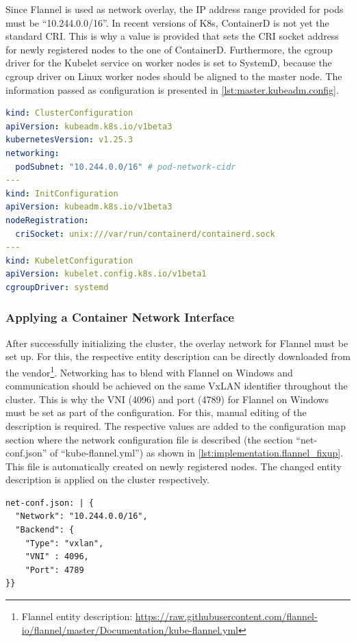 Since Flannel is used as network overlay, the \ac{IP} address range provided for pods must be \enquote{10.244.0.0/16}\cite{GitHubKubernetesSIGWindowsTools.20230213}.
In recent versions of \ac{K8s}, ContainerD is not yet the standard \ac{CRI}. This is why a value is provided that sets the \ac{CRI} socket address for newly registered nodes to the one of ContainerD.
Furthermore, the \ac{cgroup} driver for the Kubelet service on worker nodes is set to SystemD, because the \ac{cgroup} driver on Linux worker nodes should be aligned to the master node.
The information passed as configuration is presented in \autoref{lst:master.kubeadm.config}.
\begin{lstlisting}[label=lst:master.kubeadm.config, caption={YAML configuration for providing configuration for the cluster and newly registered ndoes. (\textit{Distribution/Controlplane/kubeadm\_config.yaml})}, language=yaml]
kind: ClusterConfiguration
apiVersion: kubeadm.k8s.io/v1beta3
kubernetesVersion: v1.25.3
networking:
  podSubnet: "10.244.0.0/16" # pod-network-cidr
---
kind: InitConfiguration
apiVersion: kubeadm.k8s.io/v1beta3
nodeRegistration:
  criSocket: unix:///var/run/containerd/containerd.sock
---
kind: KubeletConfiguration
apiVersion: kubelet.config.k8s.io/v1beta1
cgroupDriver: systemd
\end{lstlisting}


\subsubsection{Applying a Container Network Interface}
After successfully initializing the cluster, the overlay network for Flannel must be set up.
For this, the respective entity description can be directly downloaded from the vendor\footnote{Flannel entity description: \href{https://raw.githubusercontent.com/flannel-io/flannel/master/Documentation/kube-flannel.yml}{https://raw.githubusercontent.com/flannel-io/flannel/master/Documentation/kube-flannel.yml}}. Networking has to blend with Flannel on \ac{Windows} and communication should be achieved on the same \ac{VxLAN} identifier throughout the cluster. This is why the \ac{VNI} (4096) and port (4789) for Flannel on \ac{Windows} must be set as part of the configuration. For this, manual editing of the description is required. The respective values are added to the configuration map section where the network configuration file is described (the section \enquote{net-conf.json} of \enquote{kube-flannel.yml}) as shown in \autoref{lst:implementation.flannel_fixup}. This file is automatically created on newly registered nodes. The changed entity description is applied on the cluster respectively.
\begin{lstlisting}[label=lst:implementation.flannel_fixup, caption={Fixup for Flannel manifest. Here the values \tcode{VNI} and \tcode{Port} were added. (\textit{kube-flannel.yml})}]
net-conf.json: | {
  "Network": "10.244.0.0/16",
  "Backend": {
    "Type": "vxlan",
    "VNI" : 4096,
    "Port": 4789
}}
\end{lstlisting}


